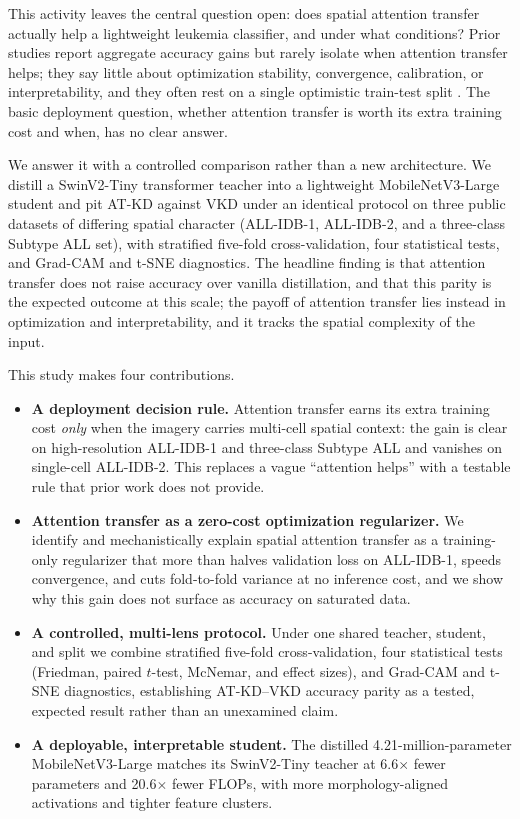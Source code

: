 \documentclass[preprint,review,12pt]{elsarticle}
\begin{document}
This activity leaves the central question open: does spatial attention
transfer actually help a lightweight leukemia classifier, and under what
conditions? Prior studies report aggregate accuracy gains but rarely
isolate when attention transfer helps; they say little about
optimization stability, convergence, calibration, or interpretability,
and they often rest on a single optimistic train-test split
\cite{ref16,ref17,ref33,ref34,ref35,ref36}. The basic deployment
question, whether attention transfer is worth its extra training cost and
when, has no clear answer.

We answer it with a controlled comparison rather than a new architecture.
We distill a SwinV2-Tiny transformer teacher into a lightweight
MobileNetV3-Large student and pit AT-KD against VKD under an identical
protocol on three public datasets of differing spatial character
(ALL-IDB-1, ALL-IDB-2, and a three-class Subtype ALL set), with
stratified five-fold cross-validation, four statistical tests, and
Grad-CAM and t-SNE diagnostics. The headline finding is that attention
transfer does not raise accuracy over vanilla distillation, and that this
parity is the expected outcome at this scale; the payoff of attention
transfer lies instead in optimization and interpretability, and it tracks
the spatial complexity of the input.

This study makes four contributions.
\begin{itemize}
\item \textbf{A deployment decision rule.} Attention transfer earns its
extra training cost \emph{only} when the imagery carries multi-cell
spatial context: the gain is clear on high-resolution ALL-IDB-1 and
three-class Subtype ALL and vanishes on single-cell ALL-IDB-2. This
replaces a vague ``attention helps'' with a testable rule that prior work
does not provide.
\item \textbf{Attention transfer as a zero-cost optimization
regularizer.} We identify and mechanistically explain spatial attention
transfer as a training-only regularizer that more than halves validation
loss on ALL-IDB-1, speeds convergence, and cuts fold-to-fold variance at
no inference cost, and we show why this gain does not surface as accuracy
on saturated data.
\item \textbf{A controlled, multi-lens protocol.} Under one shared
teacher, student, and split we combine stratified five-fold
cross-validation, four statistical tests (Friedman, paired $t$-test,
McNemar, and effect sizes), and Grad-CAM and t-SNE diagnostics,
establishing AT-KD--VKD accuracy parity as a tested, expected result
rather than an unexamined claim.
\item \textbf{A deployable, interpretable student.} The distilled
4.21-million-parameter MobileNetV3-Large matches its SwinV2-Tiny teacher
at 6.6$\times$ fewer parameters and 20.6$\times$ fewer FLOPs, with more
morphology-aligned activations and tighter feature clusters.
\end{itemize}
\end{document}
